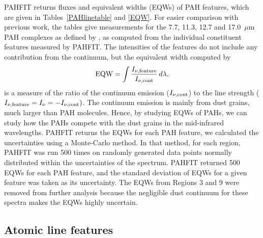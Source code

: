 PAHFIT returns fluxes and equivalent widths (EQWs) of PAH features, which are given in Tables~\ref{PAHlinetable} and \ref{EQW}. 
For easier comparison with previous work, the tables give measurements for the 7.7, 11.3, 12.7 and 17.0~$\mu$m PAH complexes
as defined by \citet{Smith:2007lr}, as computed from the individual constituent features measured by PAHFIT.
The intensities of the features do not include any contribution from the continuum, but the equivalent width computed by
\begin{equation}
{\rm EQW}=\int \frac{I_{\nu,{\rm feature}}}{I_{\nu, {\rm cont}}} \,d\lambda,
\end{equation}
is a measure of the ratio of the continuum emission ($I_{\nu, {\rm cont}} $) to the line strength 
($I_{\nu,{\rm feature}}=I_{\nu} =- I_{\nu, {\rm cont}})$. 
The continuum emission is mainly from dust grains, much larger than PAH molecules. Hence, by studying EQWs of PAHs, 
we can study how the PAHs compete with the dust grains in the mid-infrared wavelengths.  PAHFIT returns the EQWs for each PAH 
feature, we calculated the uncertainties using a Monte-Carlo method. In that method, for each region, PAHFIT was run 500 times on 
randomly generated data points  normally distributed within the uncertainties of the spectrum. PAHFIT returned 500 EQWs for each 
PAH feature, and the standard deviation of EQWs for a given feature was taken as its uncertainty. 
The EQWs from Regions 3 and 9 were removed from further analysis because the negligible dust continuum for these spectra makes
the EQWs highly uncertain.


\subsection{Atomic line features}
\label{sect:atomic}



